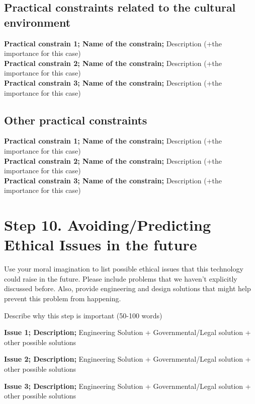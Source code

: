 \documentclass[12pt,a4paper]{article}
\begin{document}
\subsection*{Practical constraints related to the cultural environment}
\noindent \textbf{Practical constrain 1; Name of the constrain;} Description (+the importance for this case)\\
\noindent \textbf{Practical constrain 2; Name of the constrain;} Description (+the importance for this case)\\
\noindent \textbf{Practical constrain 3; Name of the constrain;} Description (+the importance for this case)

\subsection*{Other practical constraints}
\noindent \textbf{Practical constrain 1; Name of the constrain;} Description (+the importance for this case)\\
\noindent \textbf{Practical constrain 2; Name of the constrain;} Description (+the importance for this case)\\
\noindent \textbf{Practical constrain 3; Name of the constrain;} Description (+the importance for this case)

\section{Step 10. Avoiding/Predicting Ethical Issues in the future}
Use your moral imagination to list possible ethical issues that this technology could raise in the future. Please include problems that we haven’t explicitly discussed before. Also, provide engineering and design solutions that might help prevent this problem from happening.

\vspace{0.3cm}
\noindent Describe why this step is important (50-100 words)

\vspace{0.3cm}
\noindent \textbf{Issue 1; Description;} Engineering Solution + Governmental/Legal solution + other possible solutions

\vspace{0.3cm}
\noindent \textbf{Issue 2; Description;} Engineering Solution + Governmental/Legal solution + other possible solutions

\vspace{0.3cm}
\noindent \textbf{Issue 3; Description;} Engineering Solution + Governmental/Legal solution + other possible solutions
\end{document}
